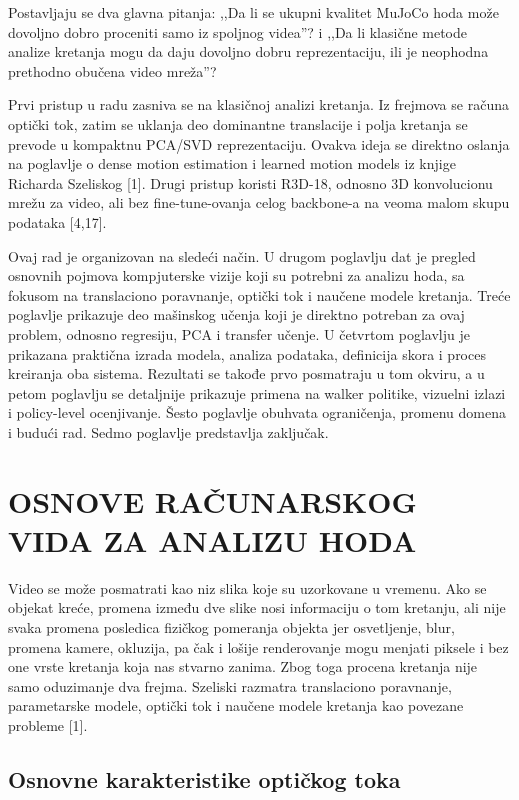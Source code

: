 \documentclass[12pt,a4paper]{report}
\begin{document}
Postavljaju se dva glavna pitanja: ,,Da li se ukupni kvalitet MuJoCo hoda može
dovoljno dobro proceniti samo iz spoljnog videa''? i ,,Da li klasične metode
analize kretanja mogu da daju dovoljno dobru reprezentaciju, ili je neophodna
prethodno obučena video mreža''?

Prvi pristup u radu zasniva se na klasičnoj analizi kretanja. Iz frejmova se
računa optički tok, zatim se uklanja deo dominantne translacije i polja kretanja
se prevode u kompaktnu PCA/SVD reprezentaciju. Ovakva ideja se direktno oslanja
na poglavlje o dense motion estimation i learned motion models iz knjige
Richarda Szeliskog [1]. Drugi pristup koristi R3D-18, odnosno 3D konvolucionu
mrežu za video, ali bez fine-tune-ovanja celog backbone-a na veoma malom skupu
podataka [4,17].

Ovaj rad je organizovan na sledeći način. U drugom poglavlju dat je pregled
osnovnih pojmova kompjuterske vizije koji su potrebni za analizu hoda, sa fokusom
na translaciono poravnanje, optički tok i naučene modele kretanja. Treće
poglavlje prikazuje deo mašinskog učenja koji je direktno potreban za ovaj
problem, odnosno regresiju, PCA i transfer učenje. U četvrtom poglavlju je
prikazana praktična izrada modela, analiza podataka, definicija skora i proces
kreiranja oba sistema. Rezultati se takođe prvo posmatraju u tom okviru, a u
petom poglavlju se detaljnije prikazuje primena na walker politike, vizuelni
izlazi i policy-level ocenjivanje. Šesto poglavlje obuhvata ograničenja,
promenu domena i budući rad. Sedmo poglavlje predstavlja zaključak.


\iffalse
\chapter{OSNOVE RAČUNARSKOG VIDA ZA ANALIZU HODA}

Video se može posmatrati kao niz slika koje su uzorkovane u vremenu. Ako se
objekat kreće, promena između dve slike nosi informaciju o tom kretanju, ali nije
svaka promena posledica fizičkog pomeranja objekta jer osvetljenje, blur, promena
kamere, okluzija, pa čak i lošije renderovanje mogu menjati piksele i bez one
vrste kretanja koja nas stvarno zanima. Zbog toga procena kretanja nije samo
oduzimanje dva frejma. Szeliski razmatra translaciono poravnanje, parametarske
modele, optički tok i naučene modele kretanja kao povezane probleme [1].

\section{Osnovne karakteristike optičkog toka}
\end{document}
